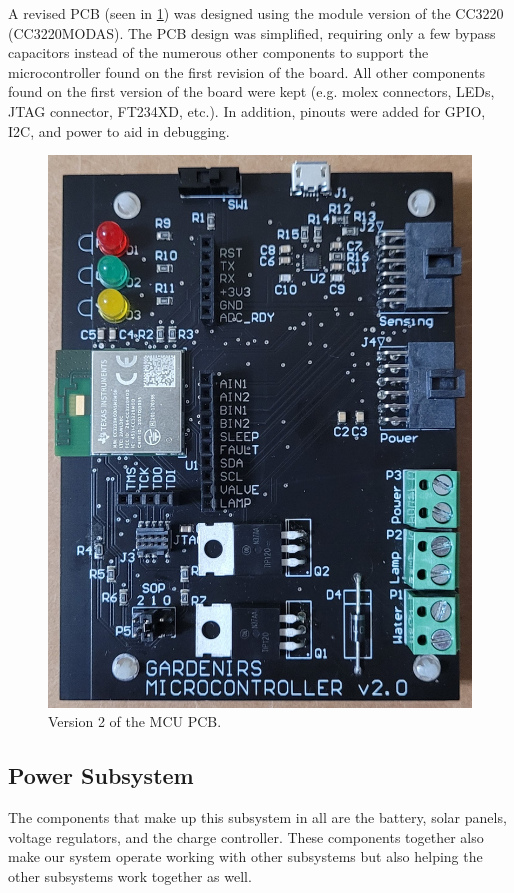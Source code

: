 \documentclass[journal]{IEEEtran}
\begin{document}
A revised PCB (seen in \ref{fig:mcu_pcb_v2}) was designed using the module version of the CC3220 (CC3220MODAS). The PCB design was simplified, requiring only a few bypass capacitors instead of the numerous other components to support the microcontroller found on the first revision of the board. All other components found on the first version of the board were kept (e.g. molex connectors, LEDs, JTAG connector, FT234XD, etc.). In addition, pinouts were added for GPIO, I2C, and power to aid in debugging.

\begin{figure}[H]
   \centering
   \label{fig:mcu_pcb_v2}
   \includegraphics[width=\linewidth]{images/mcu_pcb_v2.jpg}
   \caption{Version 2 of the MCU PCB.}
\end{figure}
\subsection{Power Subsystem} \label{sec:power-subsystem}
The components that make up this subsystem in all are the battery, solar panels, voltage regulators, 
and the charge controller. These components together also make our system operate working with other 
subsystems but also helping the other subsystems work together as well. 
\end{document}

